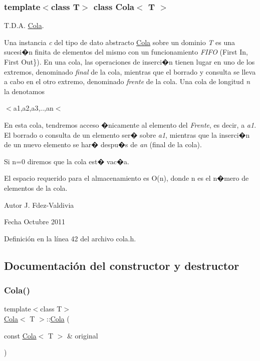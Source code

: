 \subsubsection*{template$<$class T$>$\newline
class Cola$<$ T $>$}

T.\+D.\+A. \hyperlink{classCola}{Cola}. 

Una instancia {\itshape c} del tipo de dato abstracto \hyperlink{classCola}{Cola} sobre un dominio {\itshape T} es una sucesi�n finita de elementos del mismo con un funcionamiento {\itshape F\+I\+FO} (First In, First Out\}). En una cola, las operaciones de inserci�n tienen lugar en uno de los extremos, denominado {\itshape final} de la cola, mientras que el borrado y consulta se lleva a cabo en el otro extremo, denominado {\itshape frente} de la cola. Una cola de longitud {\itshape n} la denotamos


\begin{DoxyItemize}
\item $<$a1,a2,a3,..,an$<$
\end{DoxyItemize}

En esta cola, tendremos acceso �nicamente al elemento del {\itshape Frente}, es decir, a {\itshape a1}. El borrado o consulta de un elemento ser� sobre {\itshape a1}, mientras que la inserci�n de un nuevo elemento se har� despu�s de {\itshape an} (final de la cola).

Si n=0 diremos que la cola est� vac�a.

El espacio requerido para el almacenamiento es O(n), donde n es el n�mero de elementos de la cola.

\begin{DoxyAuthor}{Autor}
J. Fdez-\/\+Valdivia 
\end{DoxyAuthor}
\begin{DoxyDate}{Fecha}
Octubre 2011 
\end{DoxyDate}


Definición en la línea 42 del archivo cola.\+h.



\subsection{Documentación del constructor y destructor}
\mbox{\label{classCola_a2249ab5603a92fddb8bd9bb55abeaa24}} 
\subsubsection{\texorpdfstring{Cola()}{Cola()}}
{\footnotesize\ttfamily template$<$class T$>$ \\
\hyperlink{classCola}{Cola}$<$ T $>$\+::\hyperlink{classCola}{Cola} (\begin{DoxyParamCaption}\item[{const \hyperlink{classCola}{Cola}$<$ T $>$ \&}]{original }\end{DoxyParamCaption})}



